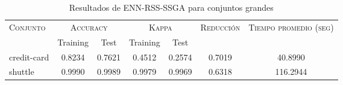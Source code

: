 \begin{table}[]
\centering
\begin{tabular}{l c c c c c c}
\hline
\multirow{2}{*}{\textsc{Conjunto}}
	& \multicolumn{2}{c}{\textsc{Accuracy}}
	& \multicolumn{2}{c}{\textsc{Kappa}}
	& \textsc{Reducción}
	& \textsc{Tiempo promedio (seg)} \\
	& Training & Test
	& Training & Test \\ 
\hline
\hline

credit-card & 0.8234 & 0.7621 & 0.4512 & 0.2574 & 0.7019 & 40.8990 \\
shuttle & 0.9990 & 0.9989 & 0.9979 & 0.9969 & 0.6318 & 116.2944  \\

\hline
\end{tabular}
\caption{Resultados de ENN-RSS-SSGA para conjuntos grandes }
\label{res-grande-ENN-RSS-ssga}
\end{table}

\clearpage

